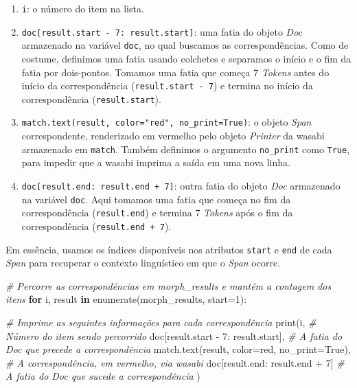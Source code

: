 \documentclass[
  brazilian,
]{article}
\newenvironment{Shaded}{}{}
\newcommand{\BuiltInTok}[1]{#1}
\newcommand{\CommentTok}[1]{\textcolor[rgb]{0.38,0.63,0.69}{\textit{#1}}}
\newcommand{\ControlFlowTok}[1]{\textcolor[rgb]{0.00,0.44,0.13}{\textbf{#1}}}
\newcommand{\DecValTok}[1]{\textcolor[rgb]{0.25,0.63,0.44}{#1}}
\newcommand{\KeywordTok}[1]{\textcolor[rgb]{0.00,0.44,0.13}{\textbf{#1}}}
\newcommand{\NormalTok}[1]{#1}
\newcommand{\OperatorTok}[1]{\textcolor[rgb]{0.40,0.40,0.40}{#1}}
\newcommand{\StringTok}[1]{\textcolor[rgb]{0.25,0.44,0.63}{#1}}
\newcommand{\VariableTok}[1]{\textcolor[rgb]{0.10,0.09,0.49}{#1}}
\providecommand{\tightlist}{%
  \setlength{\itemsep}{0pt}\setlength{\parskip}{0pt}}
\begin{document}
\begin{enumerate}
\def\labelenumi{\arabic{enumi}.}
\tightlist
\item
  \texttt{i}: o número do item na lista.
\item
  \texttt{doc{[}result.start\ -\ 7:\ result.start{]}}: uma fatia do
  objeto \emph{Doc} armazenado na variável \texttt{doc}, no qual
  buscamos as correspondências. Como de costume, definimos uma fatia
  usando colchetes e separamos o início e o fim da fatia por
  dois-pontos. Tomamos uma fatia que começa 7 \emph{Tokens} antes do
  início da correspondência (\texttt{result.start\ -\ 7}) e termina no
  início da correspondência (\texttt{result.start}).
\item
  \texttt{match.text(result,\ color="red",\ no\_print=True)}: o objeto
  \emph{Span} correspondente, renderizado em vermelho pelo objeto
  \emph{Printer} da wasabi armazenado em \texttt{match}. Também
  definimos o argumento \texttt{no\_print} como \texttt{True}, para
  impedir que a wasabi imprima a saída em uma nova linha.
\item
  \texttt{doc{[}result.end:\ result.end\ +\ 7{]}}: outra fatia do objeto
  \emph{Doc} armazenado na variável \texttt{doc}. Aqui tomamos uma fatia
  que começa no fim da correspondência (\texttt{result.end}) e termina 7
  \emph{Tokens} após o fim da correspondência
  (\texttt{result.end\ +\ 7}).
\end{enumerate}

Em essência, usamos os índices disponíveis nos atributos \texttt{start}
e \texttt{end} de cada \emph{Span} para recuperar o contexto linguístico
em que o \emph{Span} ocorre.

\begin{Shaded}
\begin{Highlighting}[]
\CommentTok{\# Percorre as correspondências em \textquotesingle{}morph\_results\textquotesingle{} e mantém a contagem dos itens}
\ControlFlowTok{for}\NormalTok{ i, result }\KeywordTok{in} \BuiltInTok{enumerate}\NormalTok{(morph\_results, start}\OperatorTok{=}\DecValTok{1}\NormalTok{):}

    \CommentTok{\# Imprime as seguintes informações para cada correspondência}
    \BuiltInTok{print}\NormalTok{(i,  }\CommentTok{\# Número do item sendo percorrido}
\NormalTok{          doc[result.start }\OperatorTok{{-}} \DecValTok{7}\NormalTok{: result.start],  }\CommentTok{\# A fatia do Doc que precede a correspondência}
\NormalTok{          match.text(result, color}\OperatorTok{=}\StringTok{\textquotesingle{}red\textquotesingle{}}\NormalTok{, no\_print}\OperatorTok{=}\VariableTok{True}\NormalTok{),  }\CommentTok{\# A correspondência, em vermelho, via wasabi}
\NormalTok{          doc[result.end: result.end }\OperatorTok{+} \DecValTok{7}\NormalTok{]  }\CommentTok{\# A fatia do Doc que sucede a correspondência}
\NormalTok{         )}
\end{Highlighting}
\end{Shaded}
\end{document}

